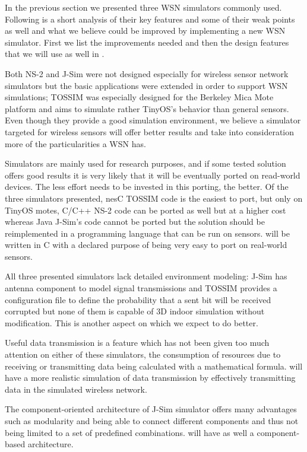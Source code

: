 In the previous section we presented three WSN simulators commonly used.
Following is a short analysis of their key features and some of their
weak points as well and what we believe could be improved by implementing a
new WSN simulator. First we list the improvements needed and then the 
design features that we will use as well in \codename. 

Both NS-2 and J-Sim were not designed especially for wireless 
sensor network simulators but the basic applications were extended
in order to support WSN simulations; TOSSIM was especially designed
for the Berkeley Mica Mote platform and aims to simulate rather TinyOS's behavior
than general sensors. Even though they provide a good simulation environment,
we believe a simulator targeted for wireless sensors will offer better results
and take into consideration more of the particularities a WSN has.

Simulators are mainly used for research purposes, and if some tested solution
offers good results it is very likely that it will be eventually ported on 
read-world devices. The less effort needs to be invested in this porting, the
better. Of the three simulators presented, nesC TOSSIM code is the easiest to port,
but only on TinyOS motes, C/C++ NS-2 code can be ported as well but at a higher
cost whereas Java J-Sim's code cannot be ported but the solution should be 
reimplemented in a programming language that can be run on sensors.
\codename will be written in C with a declared purpose of being very easy to port
on real-world sensors.

All three presented simulators lack detailed environment modeling: J-Sim has 
antenna component to model signal transmissions and TOSSIM provides a configuration
file to define the probability that a sent bit will be received corrupted but 
none of them is capable of 3D indoor simulation without modification. 
This is another aspect on which we expect \codename to do better. 

Useful data transmission is a feature which has not been given too much 
attention on either of these simulators, the consumption of resources due to
receiving or transmitting data being calculated with a mathematical formula.
 \codename will have a more realistic simulation of data transmission by effectively
transmitting data in the simulated wireless network.

The component-oriented architecture of J-Sim simulator offers many advantages
such as modularity and being able to connect different components and thus not being limited
to a set of predefined combinations. \codename will have as well a component-based
architecture.

